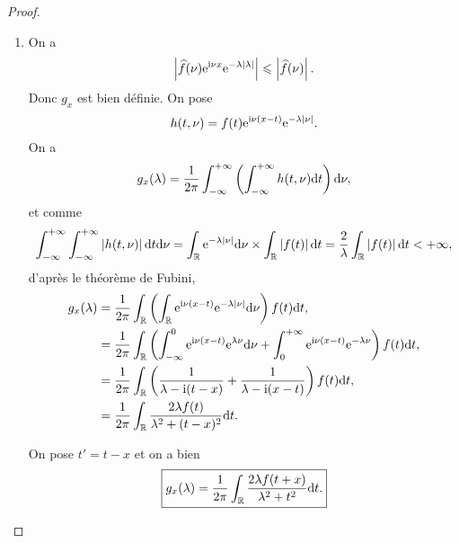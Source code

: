 \documentclass[12pt]{article}
\begin{document}
\begin{proof}
    \phantom{}
    \begin{enumerate}
        \item On a 
        \begin{equation}
            \left\lvert\widehat{f}(\nu)\mathrm{e}^{\mathrm{i}\nu x}\mathrm{e}^{-\lambda\left\lvert\lambda\right\rvert}\right\rvert\leqslant\left\lvert \widehat{f}(\nu)\right\rvert.
        \end{equation}
        Donc $g_x$ est bien définie. On pose 
        \begin{equation}
            h(t,\nu)=f(t)\mathrm{e}^{\mathrm{i}\nu(x-t)}\mathrm{e}^{-\lambda\left\lvert\nu\right\rvert}.
        \end{equation}
        On a 
        \begin{equation}
            g_x(\lambda)=\frac{1}{2\pi}\int_{-\infty}^{+\infty}\left(\int_{-\infty}^{+\infty}h(t,\nu)\mathrm{d} t\right)\mathrm{d}\nu,
        \end{equation}
        et comme 
        \begin{equation}
            \int_{-\infty}^{+\infty}\int_{-\infty}^{+\infty}\left\lvert h(t,\nu)\right\rvert\mathrm{d} t\mathrm{d}\nu=\int_{\mathbb{R}}\mathrm{e}^{-\lambda\left\lvert\nu\right\rvert}\mathrm{d}\nu\times\int_{\mathbb{R}}\left\lvert f(t)\right\rvert\mathrm{d} t=\frac{2}{\lambda}\int_{\mathbb{R}}\left\lvert f(t)\right\rvert\mathrm{d} t<+\infty,
        \end{equation}
        d'après le théorème de Fubini,
        \begin{align}
            g_x(\lambda)
            &=\frac{1}{2\pi}\int_{\mathbb{R}}\left(\int_{\mathbb{R}}\mathrm{e}^{\mathrm{i}\nu(x-t)}\mathrm{e}^{-\lambda\left\lvert\nu\right\rvert}\mathrm{d} \nu\right)f(t)\mathrm{d} t,\\
            &=\frac{1}{2\pi}\int_{\mathbb{R}}\left(\int_{-\infty}^{0}\mathrm{e}^{\mathrm{i}\nu(x-t)}\mathrm{e}^{\lambda\nu}\mathrm{d} \nu+\int_{0}^{+\infty}\mathrm{e}^{\mathrm{i}\nu(x-t)}\mathrm{e}^{-\lambda\nu}\right)f(t)\mathrm{d} t,\\
            &=\frac{1}{2\pi}\int_{\mathbb{R}}\left(\frac{1}{\lambda-\mathrm{i}(t-x)}+\frac{1}{\lambda-\mathrm{i}(x-t)}\right)f(t)\mathrm{d} t,\\
            &=\frac{1}{2\pi}\int_{\mathbb{R}}\frac{2\lambda f(t)}{\lambda^{2}+(t-x)^{2}}\mathrm{d} t.
        \end{align}

        On pose $t'=t-x$ et on a bien 
        \begin{equation}
            \boxed{
                g_x(\lambda)=\frac{1}{2\pi}\int_{\mathbb{R}}\frac{2\lambda f(t+x)}{\lambda^{2}+t^{2}}\mathrm{d} t.
            }
        \end{equation}


\end{enumerate}
\end{proof}
\end{document}

